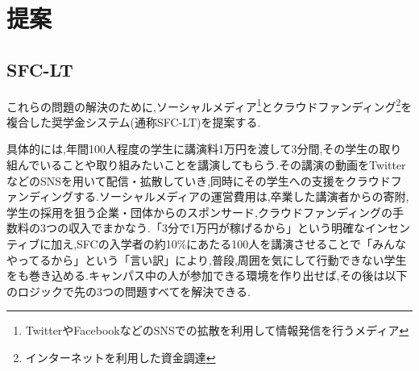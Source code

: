 \documentclass[uplatex, a4j]{jsarticle}
\begin{document}
\section{提案}
\subsection{SFC-LT}

これらの問題の解決のために,ソーシャルメディア\footnote{TwitterやFacebookなどのSNSでの拡散を利用して情報発信を行うメディア}とクラウドファンディング\footnote{インターネットを利用した資金調達}を複合した奨学金システム(通称SFC-LT)を提案する.

具体的には,年間100人程度の学生に講演料1万円を渡して3分間,その学生の取り組んでいることや取り組みたいことを講演してもらう.その講演の動画をTwitterなどのSNSを用いて配信・拡散していき,同時にその学生への支援をクラウドファンディングする.ソーシャルメディアの運営費用は,卒業した講演者からの寄附,学生の採用を狙う企業・団体からのスポンサード,クラウドファンディングの手数料の3つの収入でまかなう.「3分で1万円が稼げるから」という明確なインセンティブに加え,SFCの入学者の約10\%にあたる100人を講演させることで「みんなやってるから」という「言い訳」により,普段,周囲を気にして行動できない学生をも巻き込める.キャンパス中の人が参加できる環境を作り出せば,その後は以下のロジックで先の3つの問題すべてを解決できる.
\end{document}
